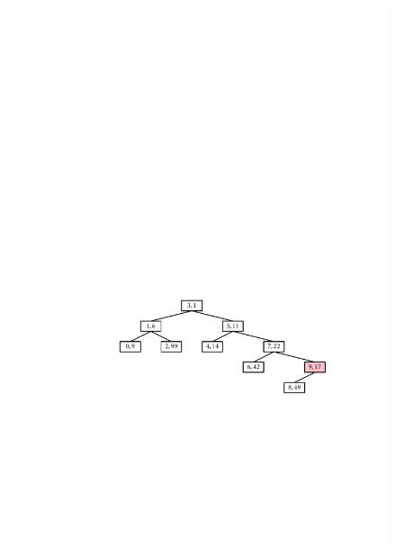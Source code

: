 \begin{figure}
\begin{center}
  \includegraphics[height=\QuarterHeightScaleIfNeeded]{figs/treap-delete-b} \\

\end{center}
\end{figure}
